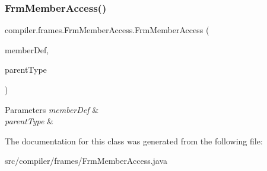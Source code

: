 \subsubsection{\texorpdfstring{Frm\+Member\+Access()}{FrmMemberAccess()}}
{\footnotesize\ttfamily compiler.\+frames.\+Frm\+Member\+Access.\+Frm\+Member\+Access (\begin{DoxyParamCaption}\item[{\hyperlink{classcompiler_1_1abstr_1_1tree_1_1def_1_1_abs_var_def}{Abs\+Var\+Def}}]{member\+Def,  }\item[{\hyperlink{classcompiler_1_1seman_1_1type_1_1_object_type}{Object\+Type}}]{parent\+Type }\end{DoxyParamCaption})}


\begin{DoxyParams}{Parameters}
{\em member\+Def} & \\
\hline
{\em parent\+Type} & \\
\hline
\end{DoxyParams}


The documentation for this class was generated from the following file\+:\begin{DoxyCompactItemize}
\item 
src/compiler/frames/Frm\+Member\+Access.\+java\end{DoxyCompactItemize}
